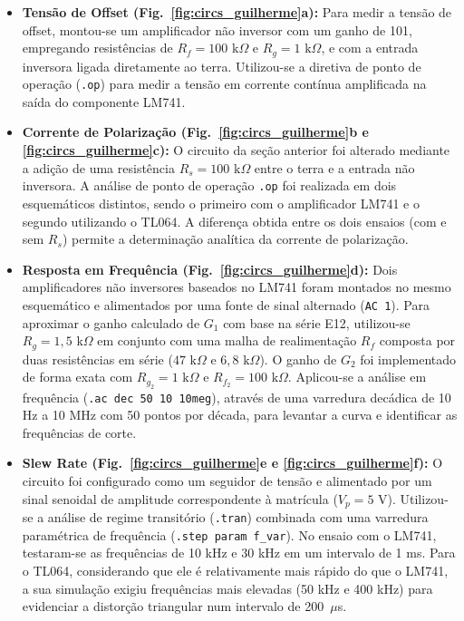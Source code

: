 \documentclass[11pt,a4paper]{article}
\begin{document}
\begin{itemize}
    \item \textbf{Tensão de Offset (Fig.~\ref{fig:circs_guilherme}a):} Para medir a tensão de offset, montou-se um amplificador não inversor com um ganho de 101, empregando resistências de $R_f=100\text{ k}\Omega$ e $R_g=1\text{ k}\Omega$, e com a entrada inversora ligada diretamente ao terra. Utilizou-se a diretiva de ponto de operação (\texttt{.op}) para medir a tensão em corrente contínua amplificada na saída do componente LM741.
    
    \item \textbf{Corrente de Polarização (Fig.~\ref{fig:circs_guilherme}b e \ref{fig:circs_guilherme}c):} O circuito da seção anterior foi alterado mediante a adição de uma resistência $R_s=100\text{ k}\Omega$ entre o terra e a entrada não inversora. A análise de ponto de operação \texttt{.op} foi realizada em dois esquemáticos distintos, sendo o primeiro com o amplificador LM741 e o segundo utilizando o TL064. A diferença obtida entre os dois ensaios (com e sem $R_s$) permite a determinação analítica da corrente de polarização.

    \item \textbf{Resposta em Frequência (Fig.~\ref{fig:circs_guilherme}d):} Dois amplificadores não inversores baseados no LM741 foram montados no mesmo esquemático e alimentados por uma fonte de sinal alternado (\texttt{AC 1}). Para aproximar o ganho calculado de $G_1$ com base na série E12, utilizou-se $R_g=1{,}5\text{ k}\Omega$ em conjunto com uma malha de realimentação  $R_f$ composta por duas resistências em série ($47\text{ k}\Omega$ e $6{,}8\text{ k}\Omega$). O ganho de $G_2$ foi implementado de forma exata com $R_{g_{2}}=1\text{ k}\Omega$ e $R_{f_{2}}=100\text{ k}\Omega$. Aplicou-se a análise em frequência (\texttt{.ac dec 50 10 10meg}), através de uma varredura decádica de 10 Hz a 10 MHz com 50 pontos por década, para levantar a curva e identificar as frequências de corte.     
    
    \item \textbf{Slew Rate (Fig.~\ref{fig:circs_guilherme}e e \ref{fig:circs_guilherme}f):} O circuito foi configurado como um seguidor de tensão e alimentado por um sinal senoidal de amplitude correspondente à matrícula ($V_p=5\text{ V}$). Utilizou-se a análise de regime transitório (\texttt{.tran}) combinada com uma varredura paramétrica de frequência (\texttt{.step param f\_var}). No ensaio com o LM741, testaram-se as frequências de 10 kHz e 30 kHz em um intervalo de 1 ms. Para o TL064, considerando que ele é relativamente mais rápido do que o LM741, a sua simulação exigiu frequências mais elevadas (50 kHz e 400 kHz) para evidenciar a distorção triangular num intervalo de 200~$\mu$s. 
\end{itemize}
\end{document}
